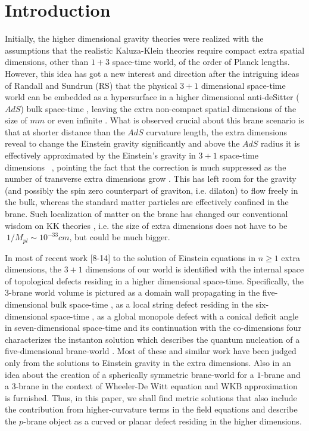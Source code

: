 \documentclass[a4paper,12pt]{article}
\begin{document}
\section{Introduction}
Initially, the higher dimensional gravity theories \cite{BSD,CWE} 
were realized with the assumptions that the realistic Kaluza-Klein theories
\cite{APP} require compact extra spatial dimensions, other than 
$1+3$ space-time world, of the order of Planck lengths. However, this idea 
has got a new interest and direction after the intriguing ideas of Randall
and Sundrun (RS) that the physical $3+1$ dimensional space-time world can 
be embedded as a hypersurface in a higher dimensional anti-deSitter ($AdS$) 
bulk space-time \cite{RS1}, leaving the extra non-compact spatial dimensions 
\cite{VAR} of the size of $mm$ or even infinite \cite{RS1,NAH}. What is 
observed crucial about this brane scenario is that at shorter distance than 
the $AdS$ curvature length, the extra dimensions reveal to change the 
Einstein gravity significantly and above the $AdS$ radius it is effectively 
approximated by the Einstein's gravity in $3+1$ space-time dimensions~ 
\cite{RS1,CCS}, pointing the fact that the correction is much suppressed 
as the number of transverse extra dimensions grow \cite{TGM}. This has left 
room for the gravity (and possibly the spin zero counterpart of graviton, 
i.e. dilaton) to flow freely in the bulk, whereas the standard matter 
particles are effectively confined in the brane. Such localization of matter 
on the brane \cite{RS1,TGM,ODA} has changed our conventional wisdom on 
KK theories \cite{APP}, i.e. the size of extra dimensions does not have to 
be $~1/M_{pl}\sim 10^{-33} cm$, but could be much bigger.

In most of recent work [8-14] to the solution of Einstein equations in 
$n\geq 1$ extra dimensions, the $3+1$ dimensions of our world is 
identified with the internal space of topological 
defects residing in a higher dimensional space-time. Specifically, 
the $3$-brane world volume is pictured as a domain wall propagating in the 
five-dimensional bulk space-time \cite{RS1,ODA}, as a local string defect 
residing in the six-dimensional space-time \cite{TGM,ODA,ACE,AGC}, as a 
global monopole defect with a conical deficit angle in seven-dimensional 
space-time \cite{IAV} and its continuation with the co-dimensions four 
characterizes the instanton solution which describes the quantum nucleation 
of a five-dimensional brane-world \cite{JGM,IAV}. Most of these and similar 
work have been judged only from the solutions to Einstein gravity in the 
extra dimensions. Also in \cite{LCK} an idea about the creation of a 
spherically symmetric brane-world for a $1$-brane and a $3$-brane in the 
context of Wheeler-De Witt equation and WKB approximation is furnished. 
Thus, in this paper, we shall find metric solutions that also include 
the contribution from higher-curvature terms in the field equations and 
describe the $p$-brane object as a curved or planar defect residing in the 
higher dimensions.
\end{document}
